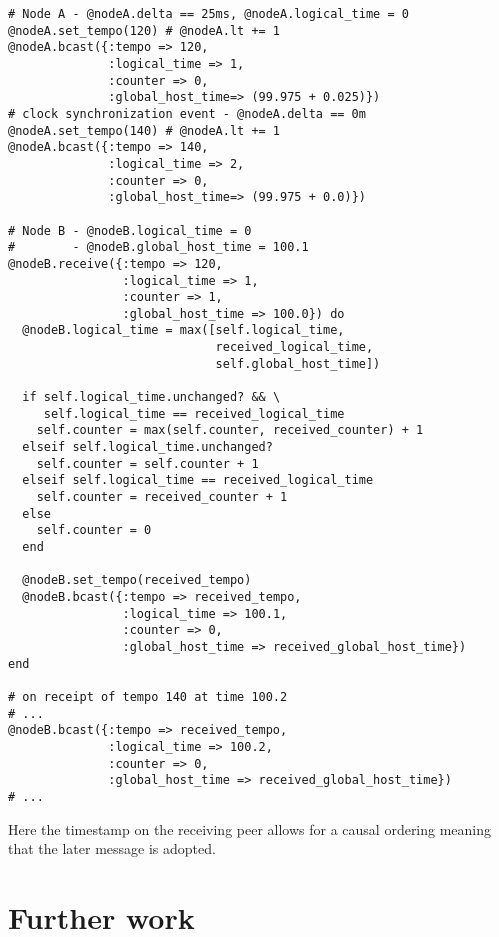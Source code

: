 \documentclass[11pt]{article} %
\theoremstyle{plain}
\theoremstyle{definition}
\begin{document}
\begin{verbatim}
# Node A - @nodeA.delta == 25ms, @nodeA.logical_time = 0
@nodeA.set_tempo(120) # @nodeA.lt += 1
@nodeA.bcast({:tempo => 120,
              :logical_time => 1,
              :counter => 0,
              :global_host_time=> (99.975 + 0.025)})
# clock synchronization event - @nodeA.delta == 0m
@nodeA.set_tempo(140) # @nodeA.lt += 1
@nodeA.bcast({:tempo => 140,
              :logical_time => 2,
              :counter => 0,
              :global_host_time=> (99.975 + 0.0)})

# Node B - @nodeB.logical_time = 0
#        - @nodeB.global_host_time = 100.1
@nodeB.receive({:tempo => 120,
                :logical_time => 1,
                :counter => 1,
                :global_host_time => 100.0}) do
  @nodeB.logical_time = max([self.logical_time,
                             received_logical_time,
                             self.global_host_time])

  if self.logical_time.unchanged? && \
     self.logical_time == received_logical_time
    self.counter = max(self.counter, received_counter) + 1
  elseif self.logical_time.unchanged?
    self.counter = self.counter + 1
  elseif self.logical_time == received_logical_time
    self.counter = received_counter + 1
  else
    self.counter = 0
  end

  @nodeB.set_tempo(received_tempo)
  @nodeB.bcast({:tempo => received_tempo,
                :logical_time => 100.1,
                :counter => 0,
                :global_host_time => received_global_host_time})
end

# on receipt of tempo 140 at time 100.2
# ...
@nodeB.bcast({:tempo => received_tempo,
              :logical_time => 100.2,
              :counter => 0,
              :global_host_time => received_global_host_time})
# ...
\end{verbatim}

Here the timestamp on the receiving peer allows for a causal ordering meaning
that the later message is adopted.

\section{Further work}

\end{document}
